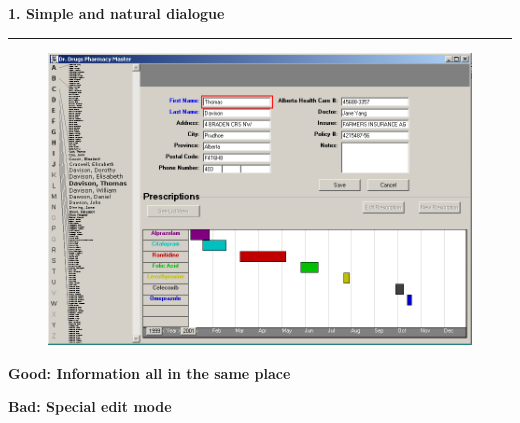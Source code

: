 \documentclass[pdf]{beamer}
\begin{document}
\begin{frame}
{\textbf{1. Simple and natural dialogue}}{\textcolor{red}{\rule{12cm}{1.2pt}}}

	\begin{figure}[b]
      \includegraphics[scale = 0.47]{9_Picture1.png}
  	\end{figure}

    \hspace{150px}\fontsize{7pt}{10pt}\textbf{Good: Information all in the same place}

   \hspace{150px}\fontsize{7pt}{10pt}\textbf{Bad: Special edit mode}
   
 	\fontsize{4pt}{0.5pt}
\end{frame}
\end{document}
